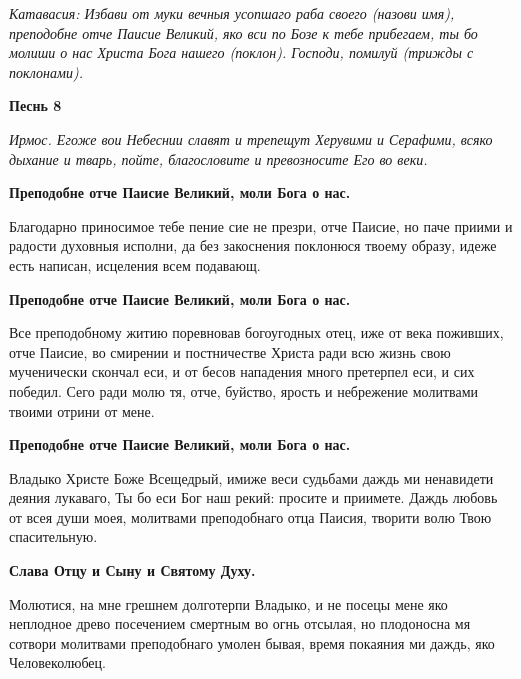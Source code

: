 \itshape Катавасия:\normalfont{} Избави от муки вечныя усопшаго раба своего (\itshape назови имя\normalfont{}), преподобне отче Паисие Великий, яко вси по Бозе к тебе прибегаем, ты бо молиши о нас Христа Бога нашего (\itshape поклон\normalfont{}). Господи, помилуй (\itshape трижды с поклонами\normalfont{}). 







\bfseries Песнь 8 \normalfont{}\nopagebreak




\itshape Ирмос\normalfont{}. Егоже вои Небеснии славят и трепещут Херувими и Серафими, всяко дыхание и тварь, пойте, благословите и превозносите Его во веки. 




\bfseries Преподобне отче Паисие Великий, моли Бога о нас.\normalfont{}\nopagebreak


Благодарно приносимое тебе пение сие не презри, отче Паисие, но паче приими и радости духовныя исполни, да без закоснения поклонюся твоему образу, идеже есть написан, исцеления всем подавающ. 




\bfseries Преподобне отче Паисие Великий, моли Бога о нас.\normalfont{}\nopagebreak


Все преподобному житию поревновав богоугодных отец, иже от века поживших, отче Паисие, во смирении и постничестве Христа ради всю жизнь свою мученически скончал еси, и от бесов нападения много претерпел еси, и сих победил. Сего ради молю тя, отче, буйство, ярость и небрежение молитвами твоими отрини от мене. 




\bfseries Преподобне отче Паисие Великий, моли Бога о нас.\normalfont{}\nopagebreak


Владыко Христе Боже Всещедрый, имиже веси судьбами даждь ми ненавидети деяния лукаваго, Ты бо еси Бог наш рекий: просите и приимете. Даждь любовь от всея души моея, молитвами преподобнаго отца Паисия, творити волю Твою спасительную. 




\bfseries Слава Отцу и Сыну и Святому Духу\normalfont{}. 




Молютися, на мне грешнем долготерпи Владыко, и не посецы мене яко неплодное древо посечением смертным во огнь отсылая, но плодоносна мя сотвори молитвами преподобнаго умолен бывая, время покаяния ми даждь, яко Человеколюбец. 




